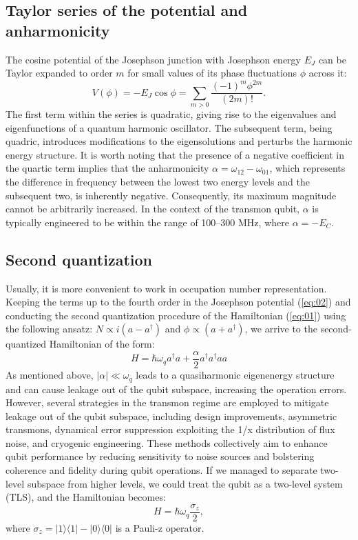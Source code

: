 \documentclass[lettersize,journal]{IEEEtran}
\begin{document}
\subsection{Taylor series of the potential and anharmonicity}

The cosine potential of the Josephson junction with Josephson energy $E_J$ can be Taylor expanded to order $m$ for small values of its phase fluctuations $\phi$ across it:
\begin{equation} \label{eq:02}
   V(\phi) = - E_J \cos \phi = \sum_{m > 0} \frac{(-1)^{m} \phi^{2m}}{(2m)!}.
\end{equation}
The first term within the series is quadratic, giving rise to the eigenvalues and eigenfunctions of a quantum harmonic oscillator.
The subsequent term, being quadric, introduces modifications to the eigensolutions and perturbs the harmonic energy structure.
It is worth noting that the presence of a negative coefficient in the quartic term implies that the anharmonicity $\alpha = \omega_{12} - \omega_{01}$, which represents the difference in frequency between the lowest two energy levels and the subsequent two, is inherently negative. 
Consequently, its maximum magnitude cannot be arbitrarily increased. 
In the context of the transmon qubit, $\alpha$ is typically engineered to be within the range of 100–300 MHz, where $\alpha = -E_C$.

\subsection{Second quantization}

Usually, it is more convenient to work in occupation number representation.
Keeping the terms up to the fourth order in the Josephson potential (\ref{eq:02}) and conducting the second quantization procedure of the Hamiltonian (\ref{eq:01}) using the following ansatz: $N \propto i(a - a^\dag)$ and $\phi \propto (a + a^\dag)$, we arrive to the second-quantized Hamiltonian of the form:
\begin{equation} \label{eq:03}
    H = \hbar \omega_q a^\dag a + \frac{\alpha}{2} a^\dag a^\dag a a
\end{equation}
As mentioned above, $|\alpha| \ll \omega_q$ leads to a quasiharmonic eigenenergy structure and can cause leakage out of the qubit subspace, increasing the operation errors.
However, several strategies in the transmon regime are employed to mitigate leakage out of the qubit subspace, including design improvements, asymmetric transmons, dynamical error suppression exploiting the 1/x distribution of flux noise, and cryogenic engineering. 
These methods collectively aim to enhance qubit performance by reducing sensitivity to noise sources and bolstering coherence and fidelity during qubit operations.
If we managed to separate two-level subspace from higher levels, we could treat the qubit as a two-level system (TLS), and the Hamiltonian becomes:
\begin{equation} \label{eq:04}
    H = \hbar \omega_q \frac{\sigma_z}{2},
\end{equation}
where $\sigma_z = |1\rangle\langle 1 | - | 0 \rangle \langle 0|$ is a Pauli-z operator.
\end{document}
